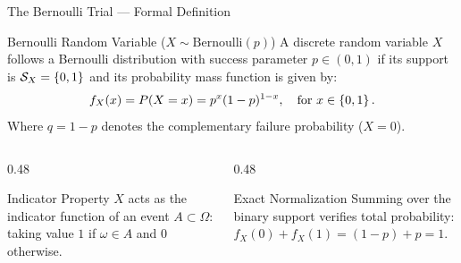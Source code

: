 \documentclass[aspectratio=169,xcolor={dvipsnames,table}]{beamer}
\begin{document}
\begin{frame}{The Bernoulli Trial --- Formal Definition}
	\begin{block}{Bernoulli Random Variable ($X \sim \text{Bernoulli}(p)$)}
		\small
		A discrete random variable $X$ follows a Bernoulli distribution with success parameter $p \in (0, 1)$ if its support is $\mathcal{S}_X = \left\{ 0, 1 \right\}$ and its probability mass function is given by:
		\begin{align*}
			f_X(x) = P(X = x) = p^x (1-p)^{1-x}, \quad \text{for } x \in \left\{ 0, 1 \right\}.
		\end{align*}
		Where $q = 1-p$ denotes the complementary failure probability ($X=0$).
	\end{block}
	\vspace{-0.1cm}
	\begin{columns}[T]
		\begin{column}{0.48\textwidth}
			\begin{exampleblock}{Indicator Property}
				\footnotesize
				$X$ acts as the indicator function of an event $A \subset \Omega$: taking value $1$ if $\omega \in A$ and $0$ otherwise.
			\end{exampleblock}
		\end{column}
		\begin{column}{0.48\textwidth}
			\begin{alertblock}{Exact Normalization}
				\footnotesize
				Summing over the binary support verifies total probability: $f_X(0) + f_X(1) = (1-p) + p = 1$.
			\end{alertblock}
		\end{column}
	\end{columns}
\end{frame}
\end{document}
